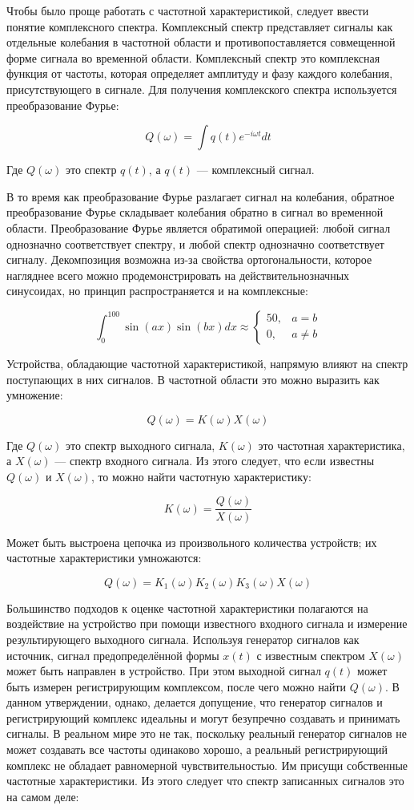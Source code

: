 \documentclass{report}
\begin{document}
Чтобы было проще работать с частотной характеристикой, следует ввести понятие комплексного спектра. Комплексный спектр представляет сигналы как отдельные колебания в частотной области и противопоставляется совмещенной форме сигнала во временной области. Комплексный спектр это комплексная функция от частоты, которая определяет амплитуду и фазу каждого колебания, присутствующего в сигнале. Для получения комплекского спектра используется преобразование Фурье:

$$
Q(\omega) = \int q(t) e^{-i \omega t} dt
$$

Где $Q(\omega)$ это спектр $q(t)$, а $q(t)$ --- комплексный сигнал.

В то время как преобразование Фурье разлагает сигнал на колебания, обратное преобразование Фурье складывает колебания обратно в сигнал во временной области. Преобразование Фурье является обратимой операцией: любой сигнал однозначно соответствует спектру, и любой спектр однозначно соответствует сигналу. Декомпозиция возможна из-за свойства ортогональности, которое нагляднее всего можно продемонстрировать на действительнозначных синусоидах, но принцип распространяется и на комплексные:

$$
\int_{0}^{100} \sin(ax) \sin(bx) dx \approx
\begin{cases}
50, & a = b \\
0, & a \ne b
\end{cases}
$$

Устройства, обладающие частотной характеристикой, напрямую влияют на спектр поступающих в них сигналов. В частотной области это можно выразить как умножение:

$$
Q(\omega) = K(\omega) X(\omega)
$$

Где $Q(\omega)$ это спектр выходного сигнала, $K(\omega)$ это частотная характеристика, а $X(\omega)$ --- спектр входного сигнала. Из этого следует, что если известны $Q(\omega)$ и $X(\omega)$, то можно найти частотную характеристику:

$$
K(\omega) = \frac{Q(\omega)}{X(\omega)}
$$

Может быть выстроена цепочка из произвольного количества устройств; их частотные характеристики умножаются:

$$
Q(\omega) = K_1(\omega) K_2(\omega) K_3(\omega) X(\omega)
$$

Большинство подходов к оценке частотной характеристики полагаются на воздействие на устройство при помощи известного входного сигнала и измерение результирующего выходного сигнала. Используя генератор сигналов как источник, сигнал предопределённой формы $x(t)$ с известным спектром $X(\omega)$ может быть направлен в устройство. При этом выходной сигнал $q(t)$ может быть измерен регистрирующим комплексом, после чего можно найти $Q(\omega)$. В данном утверждении, однако, делается допущение, что генератор сигналов и регистрирующий комплекс идеальны и могут безупречно создавать и принимать сигналы. В реальном мире это не так, поскольку реальный генератор сигналов не может создавать все частоты одинаково хорошо, а реальный регистрирующий комплекс не обладает равномерной чувствительностью. Им присущи собственные частотные характеристики. Из этого следует что спектр записанных сигналов это на самом деле:
\end{document}
